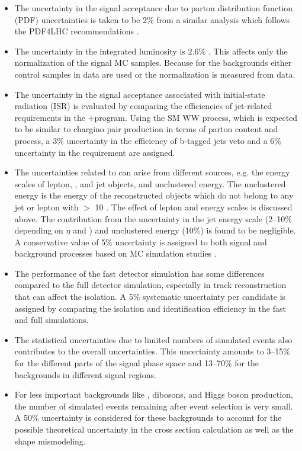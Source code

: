 \begin{itemize}
\item The uncertainty in the signal acceptance due to parton distribution function (PDF) uncertainties 
  is taken to be 2\% from a similar analysis \cite{Khachatryan:2014qwa} which follows the PDF4LHC recommendations \cite{pdf4lhc}.

\item The uncertainty in the integrated luminosity  is $2.6\%$ \cite{CMS-PAS-LUM-13-001}.  This affects only the
  normalization of the signal MC samples. Because for the backgrounds  either control samples in data are used or the normalization is measured from data.

\item The uncertainty in the signal acceptance associated with initial-state radiation (ISR)
is evaluated by comparing the efficiencies of jet-related requirements  
in the \MADGRAPH{}+\PYTHIA program. 
Using the SM WW process, which
 is expected to be similar to chargino pair production in terms of parton content and process, a 3\% uncertainty in 
the efficiency of  b-tagged jets veto and a 6\% uncertainty in the \deltaphi requirement are assigned.

\item The uncertainties related to \MPT can arise from different sources, e.g.  the energy scales of lepton, \Tau, and jet 
objects, and unclustered energy.  The unclustered energy is the energy of the reconstructed objects which
 do not belong to any jet or lepton with \PT $>$ 10 \GeV. The effect of lepton and \Tau
 energy scales is discussed above. The contribution from the uncertainty in the jet energy scale (2--10\% depending on $\eta$  and \PT) and
 unclustered energy (10\%) is found to be negligible. A conservative value of 5\% uncertainty
 is assigned to both signal and background processes based on MC simulation studies \cite{Khachatryan:2015kxa, Khachatryan:2014qwa}.

\item The performance of the fast detector simulation has some differences compared to the full detector simulation, especially in
 track reconstruction \cite{Khachatryan:2015kxa} that can affect the \Tau isolation. A 5\% systematic uncertainty per
 \Tau candidate is assigned by comparing the \Tau isolation and identification efficiency in the fast
 and full simulations. 

\item The statistical uncertainties due to limited numbers of simulated events also contributes to the overall uncertainties. 
This uncertainty amounts to 3--15\% for the different parts of the signal phase space and 13--70\% for the backgrounds in different signal regions.

\item For less important backgrounds like \ttbar,  dibosons, and Higgs boson production, the number of simulated 
events remaining after event selection is very small. A 50\% uncertainty is considered for these backgrounds 
to account for the possible theoretical uncertainty in the cross section calculation as well as the shape mismodeling.
\end{itemize}

